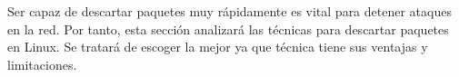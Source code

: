 Ser capaz de descartar paquetes muy rápidamente es vital para detener ataques en la red. Por tanto, esta sección analizará las técnicas para descartar paquetes en Linux. Se tratará de escoger la mejor ya que técnica tiene sus ventajas y limitaciones.